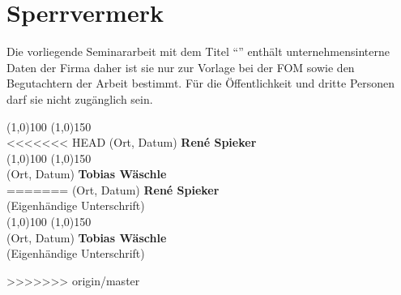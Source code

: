 \section*{Sperrvermerk}
Die vorliegende Seminararbeit mit dem Titel ``\MyTitel{}'' enthält unternehmensinterne Daten der Firma \MyFirma{} daher ist sie nur zur Vorlage bei der FOM sowie den Begutachtern der Arbeit bestimmt. Für die Öffentlichkeit und dritte Personen darf sie nicht zugänglich sein.
\\[3cm]
\begin{flushright}
\line(1,0){100} \hfill \line(1,0){150}\\
<<<<<<< HEAD
(Ort, Datum) \hfill \textbf{René Spieker}\\[1.5cm]
\line(1,0){100} \hfill \line(1,0){150}\\
(Ort, Datum) \hfill \textbf{Tobias Wäschle}\\
=======
(Ort, Datum) \hfill \textbf{René Spieker}\\
(Eigenhändige Unterschrift)\\[1.5cm]
\line(1,0){100} \hfill \line(1,0){150}\\
(Ort, Datum) \hfill \textbf{Tobias Wäschle}\\
(Eigenhändige Unterschrift)


>>>>>>> origin/master
\end{flushright}